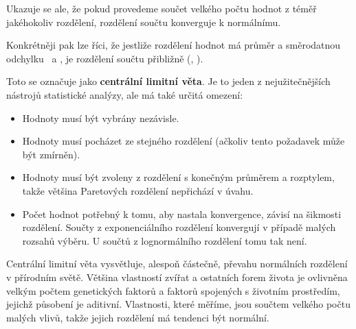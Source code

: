 \documentclass[12pt]{book}
\begin{document}
Ukazuje se ale, že pokud provedeme součet velkého počtu hodnot z téměř jakéhokoliv rozdělení, rozdělení součtu konverguje k normálnímu.

Konkrétněji pak lze říci, že jestliže rozdělení hodnot má průměr a směrodatnou odchylku \mymu~a \mysigma, je rozdělení součtu přibližně \mynormal(\n \mymu, \n \sigmasq).

Toto se označuje jako {\bf centrální limitní věta}. Je to jeden z nejužitečnějších nástrojů statistické analýzy, ale má také určitá omezení:

\begin{itemize}

\item Hodnoty musí být vybrány nezávisle.

\item Hodnoty musí pocházet ze stejného rozdělení (ačkoliv tento požadavek může být zmírněn).

\item Hodnoty musí být zvoleny z rozdělení s konečným průměrem a rozptylem, takže většina Paretových rozdělení nepřichází v úvahu.

\item Počet hodnot potřebný k tomu, aby nastala konvergence, závisí na šikmosti rozdělení. Součty z exponenciálního rozdělení konvergují v případě malých rozsahů výběru. U součtů z lognormálního rozdělení tomu tak není.

\end{itemize}


Centrální limitní věta vysvětluje, alespoň částečně, převahu normálních rozdělení v přírodním světě. Většina vlastností zvířat a ostatních forem života je ovlivněna velkým počtem genetických faktorů a faktorů spojených s životním prostředím, jejichž působení je aditivní. Vlastnosti, které měříme, jsou součtem velkého počtu malých vlivů, takže jejich rozdělení má tendenci být normální.
\end{document}

